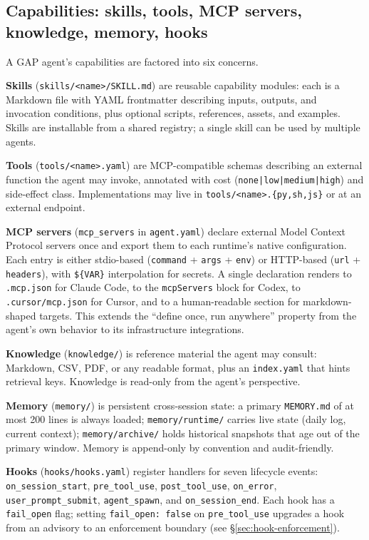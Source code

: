 \documentclass[11pt,a4paper]{article}
\begin{document}
\subsection{Capabilities: skills, tools, MCP servers, knowledge, memory, hooks}

A GAP agent's capabilities are factored into six concerns.

\textbf{Skills} (\texttt{skills/<name>/SKILL.md}) are reusable capability modules:
each is a Markdown file with YAML frontmatter describing inputs, outputs, and
invocation conditions, plus optional scripts, references, assets, and examples.
Skills are installable from a shared registry; a single skill can be used by
multiple agents.

\textbf{Tools} (\texttt{tools/<name>.yaml}) are MCP-compatible schemas describing
an external function the agent may invoke, annotated with cost
(\texttt{none|low|medium|high}) and side-effect class. Implementations may live in
\texttt{tools/<name>.\{py,sh,js\}} or at an external endpoint.

\textbf{MCP servers} (\texttt{mcp\_servers} in \texttt{agent.yaml}) declare external
Model Context Protocol servers once and export them to each runtime's native
configuration. Each entry is either stdio-based (\texttt{command} + \texttt{args} +
\texttt{env}) or HTTP-based (\texttt{url} + \texttt{headers}), with \texttt{\$\{VAR\}}
interpolation for secrets. A single declaration renders to \texttt{.mcp.json} for
Claude Code, to the \texttt{mcpServers} block for Codex, to \texttt{.cursor/mcp.json}
for Cursor, and to a human-readable section for markdown-shaped targets. This extends
the ``define once, run anywhere'' property from the agent's own behavior to its
infrastructure integrations.

\textbf{Knowledge} (\texttt{knowledge/}) is reference material the agent may consult:
Markdown, CSV, PDF, or any readable format, plus an \texttt{index.yaml} that hints
retrieval keys. Knowledge is read-only from the agent's perspective.

\textbf{Memory} (\texttt{memory/}) is persistent cross-session state: a primary
\texttt{MEMORY.md} of at most 200 lines is always loaded; \texttt{memory/runtime/}
carries live state (daily log, current context); \texttt{memory/archive/} holds
historical snapshots that age out of the primary window. Memory is append-only by
convention and audit-friendly.

\textbf{Hooks} (\texttt{hooks/hooks.yaml}) register handlers for seven lifecycle
events: \texttt{on\_session\_start}, \texttt{pre\_tool\_use}, \texttt{post\_tool\_use},
\texttt{on\_error}, \texttt{user\_prompt\_submit}, \texttt{agent\_spawn}, and
\texttt{on\_session\_end}. Each hook has a \texttt{fail\_open} flag; setting
\texttt{fail\_open: false} on \texttt{pre\_tool\_use} upgrades a hook from an advisory
to an enforcement boundary (see \S\ref{sec:hook-enforcement}).
\end{document}

